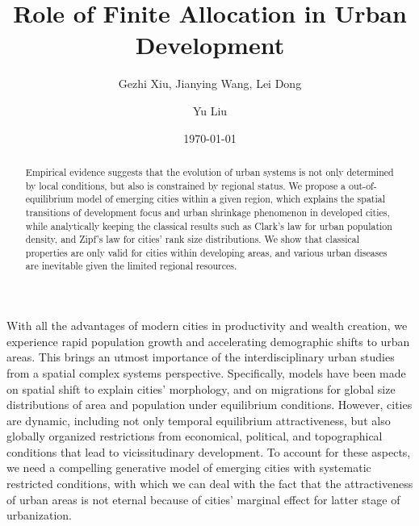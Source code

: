 \documentclass[reprint,unsortedaddress,amsmath,amssymb,aps,prl,showkeys]{revtex4-2}
\begin{document}
\title{Role of Finite Allocation in Urban Development}
\author{Gezhi Xiu, Jianying Wang, Lei Dong}
\author{Yu Liu}
\date{\today}

\begin{abstract}
	Empirical evidence suggests that the evolution of urban systems is not only determined by local conditions, but also is constrained by regional status. We propose a out-of-equilibrium model of emerging cities within a given region, which explains the spatial transitions of development focus and urban shrinkage phenomenon in developed cities, while analytically keeping the classical results such as Clark's law for urban population density, and Zipf's law for cities' rank size distributions. We show that classical properties are only valid for cities within developing areas, and various urban diseases are inevitable given the limited regional resources. 
\end{abstract}

\maketitle

With all the advantages of modern cities in productivity and wealth creation\cite{Glaeser592,bettencourt2010unified}, we experience rapid population growth and accelerating demographic shifts to urban areas.%
This brings an utmost importance of the interdisciplinary urban studies from a spatial complex systems perspective\cite{batty2007cities,batty2008size,portugali2011complexity,angel2005dynamics,boeing2017structure,PhysRevLett.79.523,bettencourt2013origins,batty2013new}. Specifically, models have been made on spatial shift to explain cities' morphology, and on migrations for global size distributions of area and population under equilibrium conditions. However, cities are dynamic, including not only temporal equilibrium attractiveness, but also globally organized restrictions from economical, political, and topographical conditions that lead to vicissitudinary development. To account for these aspects, we need a compelling generative model of emerging cities with systematic restricted conditions, with which we can deal with the fact that the attractiveness of urban areas is not eternal because of cities' marginal effect for latter stage of urbanization\cite{atkinson2012urban,girardin2009quantifying}.
\end{document}
